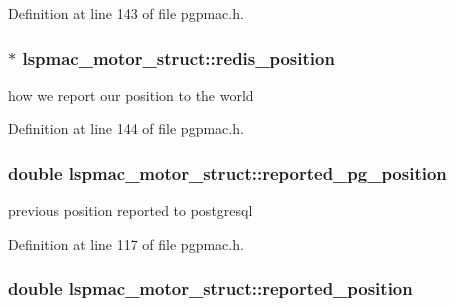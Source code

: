 Definition at line 143 of file pgpmac.\-h.

\hypertarget{structlspmac__motor__struct_af94a0b2611136058ead4948fd7c858e3}{
\subsubsection[{redis\-\_\-position}]{$\ast$ lspmac\-\_\-motor\-\_\-struct\-::redis\-\_\-position}}\label{structlspmac__motor__struct_af94a0b2611136058ead4948fd7c858e3}


how we report our position to the world 



Definition at line 144 of file pgpmac.\-h.

\hypertarget{structlspmac__motor__struct_a959bd55eb5c88a30cd4873ea567944d8}{
\subsubsection[{reported\-\_\-pg\-\_\-position}]{\setlength{\rightskip}{0pt plus 5cm}double lspmac\-\_\-motor\-\_\-struct\-::reported\-\_\-pg\-\_\-position}}\label{structlspmac__motor__struct_a959bd55eb5c88a30cd4873ea567944d8}


previous position reported to postgresql 



Definition at line 117 of file pgpmac.\-h.

\hypertarget{structlspmac__motor__struct_ae5f1f605a0f587500e627332ad4e5e7e}{
\subsubsection[{reported\-\_\-position}]{\setlength{\rightskip}{0pt plus 5cm}double lspmac\-\_\-motor\-\_\-struct\-::reported\-\_\-position}}\label{structlspmac__motor__struct_ae5f1f605a0f587500e627332ad4e5e7e}


